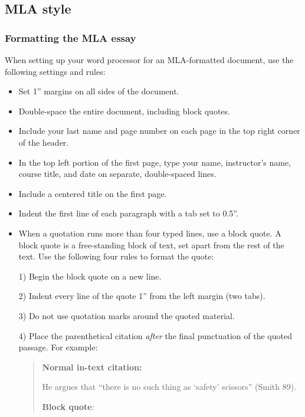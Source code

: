 

\subsection{MLA style} %


\subsubsection{Formatting the MLA essay}
When setting up your word processor for an MLA-formatted document, use the following settings and rules:

\begin{itemize}
\item Set 1'' margins on all sides of the document.
\item Double-space the entire document, including block quotes.
\item Include your last name and page number on each page in the top right corner of the header.
\item In the top left portion of the first page, type your name, instructor's name, course title, and date on separate, double-spaced lines.
\item Include a centered title on the first page.
\item Indent the first line of each paragraph with a tab set to 0.5''.
\item When a quotation runs more than four typed lines, use a block quote. A block quote is a free-standing block of text, set apart from the rest of the text. Use the following four rules to format the quote: 

1) Begin the block quote on a new line. 

2) Indent every line of the quote 1'' from the left margin (two tabs). 

3) Do not use quotation marks around the quoted material. 

4) Place the parenthetical citation \emph{after} the final punctuation of the quoted passage. For example:

\begin{quote}
\textbf{Normal in-text citation:}

He argues that ``there is no such thing as `safety' scissors'' (Smith 89).

\textbf{Block quote}: 



\end{quote}
\end{itemize}
